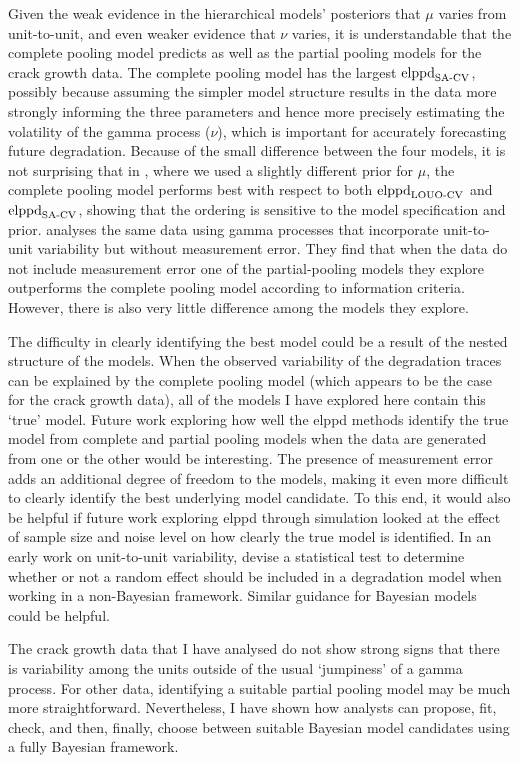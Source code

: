 Given the weak evidence in the hierarchical models' posteriors that $\mu$ varies from unit-to-unit, and even weaker evidence that $\nu$ varies, it is understandable that the complete pooling model predicts as well as the partial pooling models for the crack growth data. The complete pooling model has the largest $\hbox{elppd}_\text{SA-CV}$, possibly because assuming the simpler model structure results in the data more strongly informing the three parameters and hence more precisely estimating the volatility of the gamma process ($\nu$), which is important for accurately forecasting future degradation. Because of the small difference between the four models, it is not surprising that in \citet{leadbetter2024}, where we used a slightly different prior for $\mu$, the complete pooling model performs best with respect to both $\hbox{elppd}_\text{LOUO-CV}$ and $\hbox{elppd}_\text{SA-CV}$, showing that the ordering is sensitive to the model specification and prior. \citet{rodriguez-picon2018} analyses the same data using gamma processes that incorporate unit-to-unit variability but without measurement error. They find that when the data do not include measurement error one of the partial-pooling models they explore outperforms the complete pooling model according to information criteria. However, there is also very little difference among the models they explore.

The difficulty in clearly identifying the best model could be a result of the nested structure of the models. When the observed variability of the degradation traces can be explained by the complete pooling model (which appears to be the case for the crack growth data), all of the models I have explored here contain this `true' model. Future work exploring how well the elppd methods identify the true model from complete and partial pooling models when the data are generated from one or the other would be interesting. The presence of measurement error adds an additional degree of freedom to the models, making it even more difficult to clearly identify the best underlying model candidate. To this end, it would also be helpful if future work exploring elppd through simulation looked at the effect of sample size and noise level on how clearly the true model is identified. In an early work on unit-to-unit variability, \citet{lawless2004} devise a statistical test to determine whether or not a random effect should be included in a degradation model when working in a non-Bayesian framework. Similar guidance for Bayesian models could be helpful.

The crack growth data that I have analysed do not show strong signs that there is variability among the units outside of the usual `jumpiness' of a gamma process. For other data, identifying a suitable partial pooling model may be much more straightforward. Nevertheless, I have shown how analysts can propose, fit, check, and then, finally, choose between suitable Bayesian model candidates using a fully Bayesian framework.
